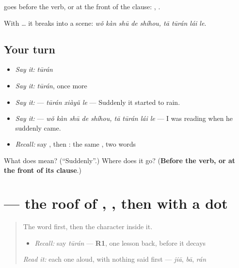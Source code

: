 \begin{grammarlens}[title={What you've built}]
 goes before the verb, or at the front of the clause: , .

With … it breaks into a scene: \textbf{ } \emph{wǒ kàn shū de shíhou, tā tūrán lái le}.
\end{grammarlens}

\subsection*{Your turn}
\begin{itemize}
\raggedright
  \item \emph{Say it:} \emph{tūrán}
  \item \emph{Say it:} \emph{tūrán}, once more
  \item \emph{Say it:}  — \emph{tūrán xiàyǔ le} — Suddenly it started to rain.
  \item \emph{Say it:}   — \emph{wǒ kàn shū de shíhou, tā tūrán lái le} — I was reading when he suddenly came.
  \item \emph{Recall:} say , then : the same , two words
\end{itemize}

\begin{tcolorbox}[breakable,colback=teal!4,colframe=teal!35!black,title={Before you move on}]
What does  mean? (\textquotedblleft{}Suddenly\textquotedblright{}.) Where does it go? (\textbf{Before the verb, or at the front of its clause}.)
\end{tcolorbox}
\section[\texorpdfstring{\zh{突} (tū)}{突 (tū)}]{ — the roof of , , then  with a dot}

\label{lesson:ZH-W279-tu}



\begin{quote}
The word first, then the character inside it.

\begin{itemize}
\raggedright
  \item \emph{Recall:} say \emph{tūrán} — \textbf{R1}, one lesson back, before it decays
\end{itemize}

\begin{quote}
  
\end{quote}

\emph{Read it:} each one aloud, with nothing said first — \emph{jiā}, \emph{bā}, \emph{rán}
\end{quote}

